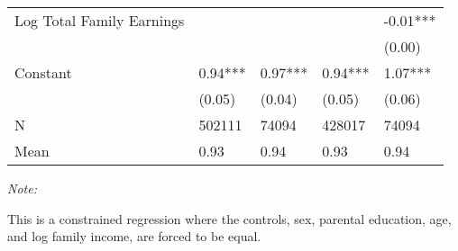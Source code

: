 \begin{table}[!h]
{\begin{threeparttable}
\begin{tabular}[c]{lllll}
Log Total Family Earnings &  &  &  & -0.01***\\
 &  &  &  & (0.00)\\
\addlinespace
Constant & 0.94*** & 0.97*** & 0.94*** & 1.07***\\
 & (0.05) & (0.04) & (0.05) & (0.06)\\
\midrule
N & 502111 & 74094 & 428017 & 74094\\
Mean & 0.93 & 0.94 & 0.93 & 0.94\\
\bottomrule
\end{tabular}
\begin{tablenotes}
\item \textit{Note: } 
\item This is a constrained regression where the controls, sex, parental education, age, and log family income, are forced to be equal.
\end{tablenotes}
\end{threeparttable}}
\end{table}
